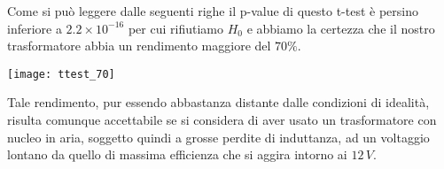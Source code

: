 \documentclass[a4paper]{article}
\begin{document}
	Come si può leggere dalle seguenti righe il p-value di questo t-test è persino inferiore a $2.2 \times 10^{-16}$ per cui rifiutiamo $H_0$ e abbiamo la certezza che il nostro trasformatore abbia un rendimento maggiore del $70\%$.
		\begin{center}
		
		\texttt{[image: ttest\_70]} 
		
	\end{center}

Tale rendimento, pur essendo abbastanza distante dalle condizioni di idealità, risulta comunque accettabile se si considera di aver usato un trasformatore con nucleo in aria, soggetto quindi a grosse perdite di induttanza, ad un voltaggio lontano da quello di massima efficienza che si aggira intorno ai $12\,V$.
	
	
	
	
	
	
	
	


\end{document}
